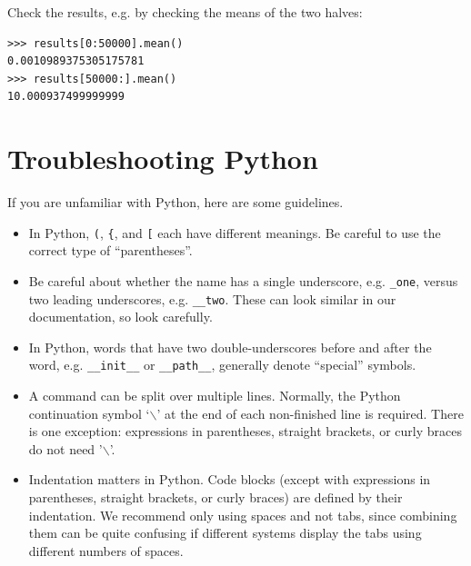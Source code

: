 Check the results, e.g. by checking the means of the two halves:
\begin{verbatim}
>>> results[0:50000].mean()
0.0010989375305175781
>>> results[50000:].mean()
10.000937499999999
\end{verbatim}

\section{Troubleshooting Python}
\label{sec:troubleshooting-python}

If you are unfamiliar with Python, here are some guidelines.

\begin{itemize}
  \item In Python, \verb|(|, \verb|{|, and \verb|[| each have different
  meanings.  Be careful to use the correct type of ``parentheses''.
  \item Be careful about whether the name has a single underscore, e.g.
  \verb|_one|, versus two leading underscores, e.g. \verb|__two|.  These can
  look similar in our documentation, so look carefully.
  \item In Python, words that have two double-underscores before and after the
  word, e.g. \verb|__init__| or \verb|__path__|, generally denote ``special''
  symbols.
  \item A command can be split over multiple lines. Normally, the Python continuation symbol `$\backslash$'
  at the end of each non-finished line is required. There is one exception:
  expressions in parentheses, straight brackets, or curly braces do not need '$\backslash$'.
  \item Indentation matters in Python. Code blocks (except with expressions
    in parentheses, straight brackets, or curly braces) are defined by
    their indentation.  We recommend only using spaces and not tabs, since
    combining them can be quite confusing if different systems display the
    tabs using different numbers of spaces.
\end{itemize}


